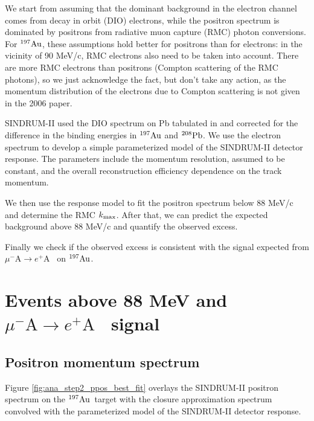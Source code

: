 \documentclass[12pt]{article}
\newcommand {\mumepconv}[1][A] {%
  \def\ArgI{{#1}}%
  \mumepconvRelay
}
\newcommand \mumepconvRelay[1][A]  {\mbox{$\mu^- \textrm{\ArgI} \rightarrow e^+ \textrm{#1}$}}
\newcommand {\Pb}[1]     {\mbox{$\rm ^{#1}Pb$}}                 %
\newcommand {\Au}[1]     {\mbox{$\rm ^{#1}Au$}}                 %
\newcommand {\kmax}      {k_{\rm max}}
\begin{document}
We start from assuming that the dominant background in the electron channel comes from 
decay in orbit (DIO) electrons,
while the positron spectrum is dominated by positrons from radiative muon capture (RMC)
photon conversions.
For \Au{197}, these assumptions hold better for positrons than for electrons:
in the vicinity of 90 MeV/c, RMC electrons also need to be taken into account.
There are more RMC electrons than positrons (Compton scattering of the RMC photons),
so we just acknowledge the fact, but don't take any action, as the momentum distribution
of the electrons due to Compton scattering is not given in the 2006 paper.

SINDRUM-II used the DIO spectrum on Pb tabulated in \cite{Watanabe_1993} and corrected for the
difference in the binding energies in \Au{197} and \Pb{208}.
We use the electron spectrum to develop a simple parameterized model of
the SINDRUM-II detector response. The parameters include the momentum resolution,
assumed to be constant, and the overall reconstruction efficiency dependence on the 
track momentum.

We then use the response model to fit the positron spectrum below 88 MeV/c and
determine the RMC $\kmax$. After that, we can predict the expected background
above 88 MeV/c and quantify the observed excess.

Finally we check if the observed excess is consistent with the signal expected from
\mumepconv\ on \Au{197}.




\newpage
\section {Events above 88 MeV and \mumepconv\ signal}


\subsection {Positron momentum spectrum}

Figure \ref{fig:ana_step2_ppos_best_fit} overlays the SINDRUM-II positron spectrum on
the \Au{197}\ target with the closure approximation spectrum convolved with the 
parameterized model of the SINDRUM-II detector response.
\end{document}
